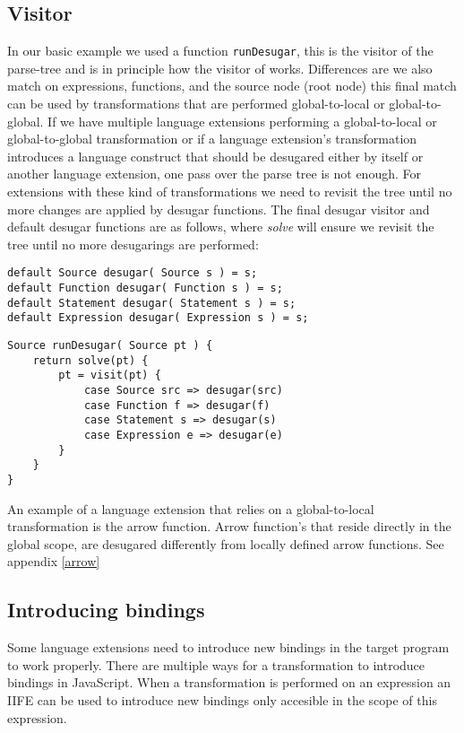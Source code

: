 \subsection{Visitor}
In our basic example we used a function \lstinline$runDesugar$, this is the visitor of the parse-tree and is in principle how the visitor of {\projectname} works. Differences are we also match on expressions, functions, and the source node (root node) this final match can be used by transformations that are performed global-to-local or global-to-global. If we have multiple language extensions performing a global-to-local or global-to-global transformation or if a language extension's transformation introduces a language construct that should be desugared either by itself or another language extension, one pass over the parse tree is not enough. For extensions with these kind of transformations we need to revisit the tree until no more changes are applied by desugar functions. The final desugar visitor and default desugar functions are as follows, where \textit{solve} will ensure we revisit the tree until no more desugarings are performed:

\begin{lstlisting}[caption=Identity desugar functions, language=rascal]
default Source desugar( Source s ) = s;
default Function desugar( Function s ) = s;
default Statement desugar( Statement s ) = s;
default Expression desugar( Expression s ) = s;
\end{lstlisting}

\begin{lstlisting}[caption=Final desugar visitor, language=rascal]
Source runDesugar( Source pt ) {
	return solve(pt) {
		pt = visit(pt) {
			case Source src => desugar(src)
			case Function f => desugar(f)
			case Statement s => desugar(s)
			case Expression e => desugar(e)
		}
	}
}
\end{lstlisting}

An example of a language extension that relies on a global-to-local transformation is the arrow function. Arrow function's that reside directly in the global scope, are desugared differently from locally defined arrow functions. See appendix \ref{arrow}

\subsection{Introducing bindings}
Some language extensions need to introduce new bindings in the target program to work properly. There are multiple ways for a transformation to introduce bindings in JavaScript. When a transformation is performed on an expression an IIFE can be used to introduce new bindings only accesible in the scope of this expression.

